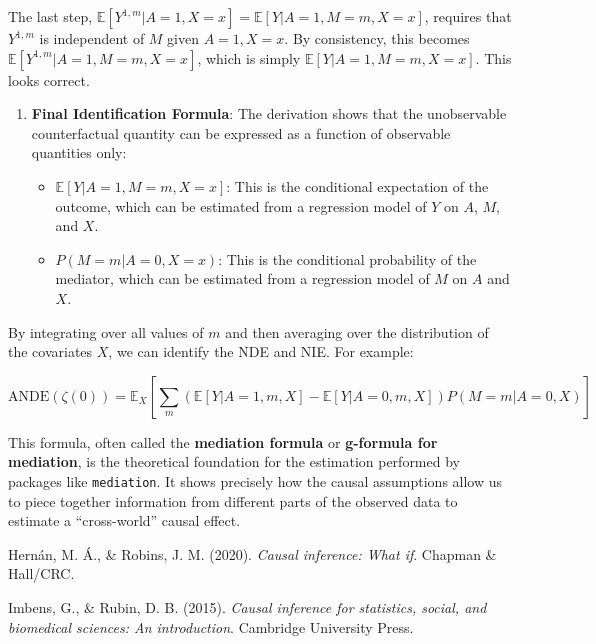 \documentclass[
  10pt,
  letterpaper,
  DIV=11,
  numbers=noendperiod,
  oneside]{scrartcl}
\newlength{\cslhangindent}
\newenvironment{CSLReferences}[2] %
 {\begin{list}{}{%
  \setlength{\itemindent}{0pt}
  \setlength{\leftmargin}{0pt}
  \setlength{\parsep}{0pt}
  \ifodd #1
   \setlength{\leftmargin}{\cslhangindent}
   \setlength{\itemindent}{-1\cslhangindent}
  \fi
  \setlength{\itemsep}{#2\baselineskip}}}
 {\end{list}}
\providecommand{\tightlist}{%
  \setlength{\itemsep}{0pt}\setlength{\parskip}{0pt}}
\begin{document}
The last step,
\(\mathbb{E}[Y^{1, m} | A=1, X=x] = \mathbb{E}[Y | A=1, M=m, X=x]\),
requires that \(Y^{1,m}\) is independent of \(M\) given \(A=1, X=x\). By
consistency, this becomes \(\mathbb{E}[Y^{1,m} | A=1, M=m, X=x]\), which
is simply \(\mathbb{E}[Y|A=1, M=m, X=x]\). This looks correct.

\begin{enumerate}
\def\labelenumi{\arabic{enumi}.}
\setcounter{enumi}{3}
\item
  \textbf{Final Identification Formula}: The derivation shows that the
  unobservable counterfactual quantity can be expressed as a function of
  observable quantities only:

  \begin{itemize}
  \tightlist
  \item
    \(\mathbb{E}[Y | A=1, M=m, X=x]\): This is the conditional
    expectation of the outcome, which can be estimated from a regression
    model of \(Y\) on \(A\), \(M\), and \(X\).
  \item
    \(P(M=m | A=0, X=x)\): This is the conditional probability of the
    mediator, which can be estimated from a regression model of \(M\) on
    \(A\) and \(X\).
  \end{itemize}
\end{enumerate}

By integrating over all values of \(m\) and then averaging over the
distribution of the covariates \(X\), we can identify the NDE and NIE.
For example:

\[
\text{ANDE}(\zeta(0)) = \mathbb{E}_X \left[ \sum_m \left( \mathbb{E}[Y|A=1,m,X] - \mathbb{E}[Y|A=0,m,X] \right) P(M=m|A=0,X) \right]
\]

This formula, often called the \textbf{mediation formula} or
\textbf{g-formula for mediation}, is the theoretical foundation for the
estimation performed by packages like \texttt{mediation}. It shows
precisely how the causal assumptions allow us to piece together
information from different parts of the observed data to estimate a
``cross-world'' causal effect.

\label{refs}
\begin{CSLReferences}{1}{0}
Hernán, M. Á., \& Robins, J. M. (2020). \emph{Causal inference: {What}
if}. Chapman \& Hall/CRC.

Imbens, G., \& Rubin, D. B. (2015). \emph{Causal inference for
statistics, social, and biomedical sciences: {An} introduction}.
Cambridge University Press.

\end{CSLReferences}
\end{document}
